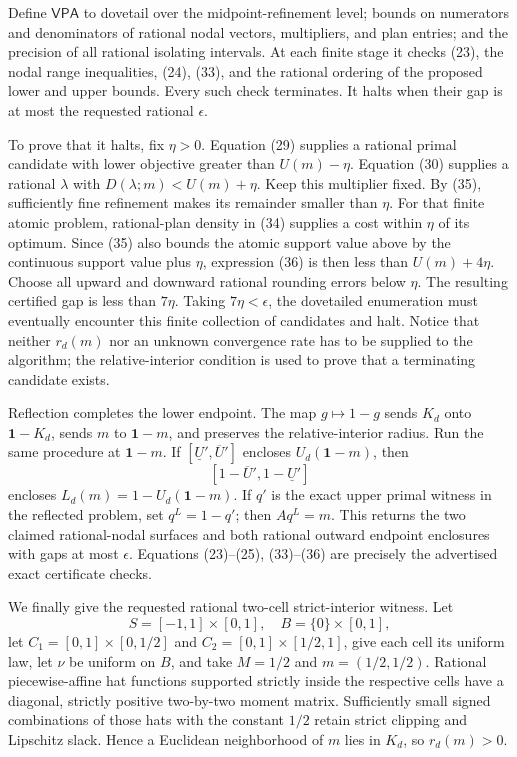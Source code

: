 Define \(\mathsf{VPA}\) to dovetail over the midpoint-refinement level; bounds
on numerators and denominators of rational nodal vectors, multipliers, and plan
entries; and the precision of all rational isolating intervals.  At each finite
stage it checks (23), the nodal range inequalities, (24), (33), and the rational
ordering of the proposed lower and upper bounds.  Every such check terminates.
It halts when their gap is at most the requested rational \(\epsilon\).

To prove that it halts, fix \(\eta>0\).  Equation (29) supplies a rational
primal candidate with lower objective greater than \(U(m)-\eta\).  Equation
(30) supplies a rational \(\lambda\) with
\(D(\lambda;m)<U(m)+\eta\).  Keep this multiplier fixed.  By (35), sufficiently
fine refinement makes its remainder smaller than \(\eta\).  For that finite
atomic problem, rational-plan density in (34) supplies a cost within \(\eta\)
of its optimum.  Since (35) also bounds the atomic support value above by the
continuous support value plus \(\eta\), expression (36) is then less than
\(U(m)+4\eta\).  Choose all upward and downward rational rounding errors below
\(\eta\).  The resulting certified gap is less than \(7\eta\).  Taking
\(7\eta<\epsilon\), the dovetailed enumeration must eventually encounter this
finite collection of candidates and halt.  Notice that neither \(r_d(m)\) nor
an unknown convergence rate has to be supplied to the algorithm; the
relative-interior condition is used to prove that a terminating candidate
exists.

Reflection completes the lower endpoint.  The map \(g\mapsto1-g\) sends
\(K_d\) onto \(\mathbf1-K_d\), sends \(m\) to \(\mathbf1-m\), and preserves the
relative-interior radius.  Run the same procedure at \(\mathbf1-m\).  If
\([\underline U',\overline U']\) encloses
\(U_d(\mathbf1-m)\), then
\[
 [1-\overline U',1-\underline U']
\]
encloses \(L_d(m)=1-U_d(\mathbf1-m)\).  If \(q'\) is the exact upper primal
witness in the reflected problem, set \(q^L=1-q'\); then
\(Aq^L=m\).  This returns the two claimed rational-nodal surfaces and both
rational outward endpoint enclosures with gaps at most \(\epsilon\).  Equations
(23)--(25), (33)--(36) are precisely the advertised exact certificate checks.

We finally give the requested rational two-cell strict-interior witness.  Let
\[
 S=[-1,1]\times[0,1],\quad B=\{0\}\times[0,1],
\]
let
\(C_1=[0,1]\times[0,1/2]\) and
\(C_2=[0,1]\times[1/2,1]\), give each cell its uniform law, let \(\nu\) be
uniform on \(B\), and take \(M=1/2\) and
\(m=(1/2,1/2)\).  Rational piecewise-affine hat functions supported strictly
inside the respective cells have a diagonal, strictly positive two-by-two
moment matrix.  Sufficiently small signed combinations of those hats with the
constant \(1/2\) retain strict clipping and Lipschitz slack.  Hence a Euclidean
neighborhood of \(m\) lies in \(K_d\), so \(r_d(m)>0\).

